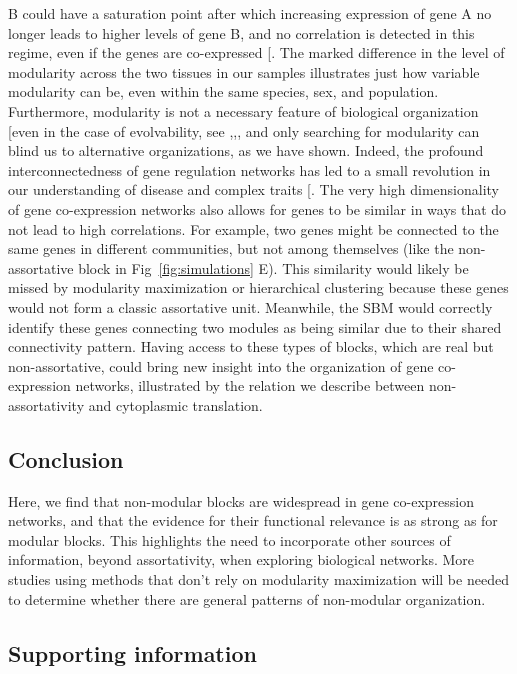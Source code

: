 \documentclass[
]{article}
\begin{document}
B could have a saturation point after which increasing expression of
gene A no longer leads to higher levels of gene B, and no correlation is
detected in this regime, even if the genes are co-expressed
{[}\citeproc{ref-Cai2023-mb}{59}{]}. The marked difference in the level
of modularity across the two tissues in our samples illustrates just how
variable modularity can be, even within the same species, sex, and
population. Furthermore, modularity is not a necessary feature of
biological organization {[}even in the case of evolvability, see
,,\citeproc{ref-Pavlicev2011-xm}{62}{]},
and only searching for modularity can blind us to alternative
organizations, as we have shown. Indeed, the profound interconnectedness
of gene regulation networks has led to a small revolution in our
understanding of disease and complex traits
{[}\citeproc{ref-Boyle2017-re}{63}{]}. The very high dimensionality of
gene co-expression networks also allows for genes to be similar in ways
that do not lead to high correlations. For example, two genes might be
connected to the same genes in different communities, but not among
themselves (like the non-assortative block in Fig~\ref{fig:simulations}
E). This similarity would likely be missed by modularity maximization or
hierarchical clustering because these genes would not form a classic
assortative unit. Meanwhile, the SBM would correctly identify these
genes connecting two modules as being similar due to their shared
connectivity pattern. Having access to these types of blocks, which are
real but non-assortative, could bring new insight into the organization
of gene co-expression networks, illustrated by the relation we describe
between non-assortativity and cytoplasmic translation.

\subsection{Conclusion}\label{conclusion}

Here, we find that non-modular blocks are widespread in gene
co-expression networks, and that the evidence for their functional
relevance is as strong as for modular blocks. This highlights the need
to incorporate other sources of information, beyond assortativity, when
exploring biological networks. More studies using methods that don't
rely on modularity maximization will be needed to determine whether
there are general patterns of non-modular organization.

\subsection{Supporting information}\label{supporting-information}
\end{document}
